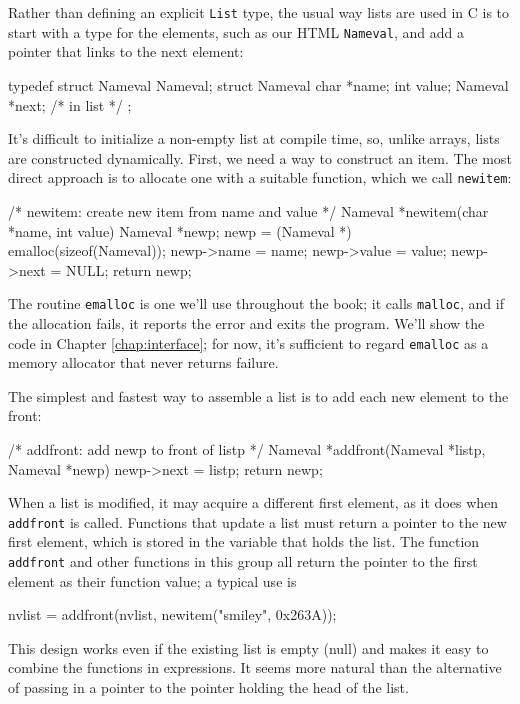 Rather than defining an explicit \verb'List' type, the usual way lists are
used in C is to start with a type for the elements, such as our HTML
\verb'Nameval', and add a pointer that links to the next element:
\begin{wellcode}
    typedef struct Nameval Nameval;
    struct Nameval {
        char *name;
        int value;
        Nameval *next; /* in list */
    };
\end{wellcode}
It's difficult to initialize a non-empty list at compile time, so, unlike
arrays, lists are constructed dynamically. First, we need a way to
construct an item. The most direct approach is to allocate one with a
suitable function, which we call \verb'newitem':
\begin{wellcode}
    /* newitem: create new item from name and value */
    Nameval *newitem(char *name, int value)
    {
        Nameval *newp;
        newp = (Nameval *) emalloc(sizeof(Nameval));
        newp->name = name;
        newp->value = value;
        newp->next = NULL;
        return newp;
    }
\end{wellcode}
The routine \verb'emalloc' is one we'll use throughout the book; it calls
\verb'malloc', and if the allocation fails, it reports the error and exits
the program. We'll show the code in Chapter \ref{chap:interface}; for now,
it's sufficient to regard \verb'emalloc' as a memory allocator that never
returns failure.

The simplest and fastest way to assemble a list is to add each new element
to the front:
\begin{wellcode}
    /* addfront: add newp to front of listp */
    Nameval *addfront(Nameval *listp, Nameval *newp)
    {
        newp->next = listp;
        return newp;
    }
\end{wellcode}

When a list is modified, it may acquire a different first element, as it
does when \verb'addfront' is called. Functions that update a list must
return a pointer to the new first element, which is stored in the variable
that holds the list. The function \verb'addfront' and other functions in
this group all return the pointer to the first element as their function
value; a typical use is
\begin{wellcode}
    nvlist = addfront(nvlist, newitem("smiley", 0x263A));
\end{wellcode}
This design works even if the existing list is empty (null) and makes it
easy to combine the functions in expressions. It seems more natural than
the alternative of passing in a pointer to the pointer holding the head of
the list.

